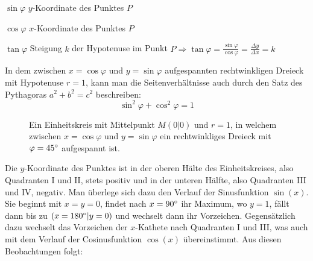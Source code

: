 $\sin \varphi$  $y$-Koordinate des Punktes $P$

$\cos \varphi$  $x$-Koordinate des Punktes $P$

$\tan \varphi$  Steigung $k$ der Hypotenuse im Punkt $P \Rightarrow \tan \varphi = \frac{\sin \varphi}{\cos \varphi} = \frac{\Delta y}{\Delta x} = k$

In dem zwischen $x = \cos \varphi$ und $y = \sin \varphi$ aufgespannten rechtwinkligen Dreieck mit Hypotenuse $r = 1$, kann man die Seitenverh\"{a}ltnisse auch durch den Satz des Pythagoras $a^2 + b^2 = c^2$ beschreiben: $$\sin^2 \varphi + \cos^2 \varphi = 1$$

\pagebreak

\begin{figure}[t!]
\centering
	\caption*{Ein Einheitskreis mit Mittelpunkt $M (0 | 0)$ und $r = 1$, in welchem zwischen $x = \cos \varphi$ und $y = \sin \varphi$ ein rechtwinkliges Dreieck mit $\varphi = 45\degree$ aufgespannt ist.}
\end{figure}

Die  $y$-Koordinate des Punktes ist in der oberen H\"{a}lte des Einheitskreises, also Quadranten I und II, stets positiv und in der unteren H\"{a}lfte, also Quadranten III und IV, negativ. Man \"{u}berlege sich dazu den Verlauf der Sinusfunktion $\sin(x)$. Sie beginnt mit $x = y = 0$, findet nach $x = 90\degree$ ihr Maximum, wo $y = 1$, f\"{a}llt dann bis zu $(x = 180\degree | y = 0)$ und wechselt dann ihr Vorzeichen. Gegens\"{a}tzlich dazu wechselt das Vorzeichen der $x$-Kathete nach Quadranten I und III, was auch mit dem Verlauf der Cosinusfunktion $\cos(x)$ \"{u}bereinstimmt. Aus diesen Beobachtungen folgt:

